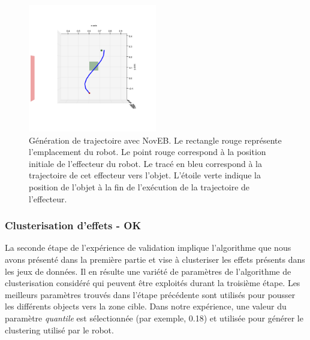 \documentclass[draft]{llncs}
\begin{document}
\begin{figure}[ht]
  \begin{center}
    \includegraphics[width=0.5\textwidth]{figures/ns_trajectory.png}
    \caption{Génération de trajectoire avec NovEB. Le rectangle rouge représente l'emplacement du robot. Le point rouge correspond à la position initiale de l'effecteur du robot. Le tracé en bleu correspond à la trajectoire de cet effecteur vers l'objet. L'étoile verte indique la position de l'objet à la fin de l'exécution de la trajectoire de l'effecteur.}
    \label{fig:ns_traj}
  \end{center}
\end{figure}




\subsubsection{Clusterisation d'effets - OK}

La seconde étape de l'expérience de validation implique l'algorithme que nous avons présenté dans la première partie et vise à clusteriser les effets présents dans les jeux de données.
Il en résulte une variété de paramètres de l'algorithme de clusterisation considéré qui peuvent être exploités durant la troisième étape.
Les meilleurs paramètres trouvés dans l'étape précédente sont utilisés pour pousser les différents objects vers la zone cible.
Dans notre expérience, une valeur du paramètre \textit{quantile} est sélectionnée (par exemple, 0.18) et utilisée pour générer le clustering utilisé par le robot.

\end{document}
